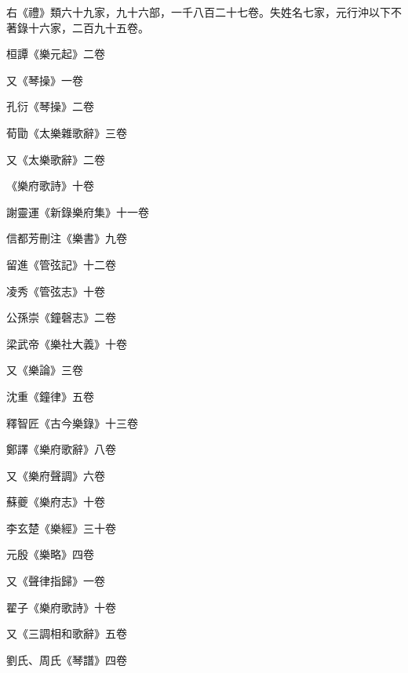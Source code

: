 \begin{pinyinscope}
 右《禮》類六十九家，九十六部，一千八百二十七卷。失姓名七家，元行沖以下不著錄十六家，二百九十五卷。



 桓譚《樂元起》二卷



 又《琴操》一卷



 孔衍《琴操》二卷



 荀勖《太樂雜歌辭》三卷



 又《太樂歌辭》二卷



 《樂府歌詩》十卷



 謝靈運《新錄樂府集》十一卷



 信都芳刪注《樂書》九卷



 留進《管弦記》十二卷



 凌秀《管弦志》十卷



 公孫崇《鐘磬志》二卷



 梁武帝《樂社大義》十卷



 又《樂論》三卷



 沈重《鐘律》五卷



 釋智匠《古今樂錄》十三卷



 鄭譯《樂府歌辭》八卷



 又《樂府聲調》六卷



 蘇夔《樂府志》十卷



 李玄楚《樂經》三十卷



 元殷《樂略》四卷



 又《聲律指歸》一卷



 翟子《樂府歌詩》十卷



 又《三調相和歌辭》五卷



 劉氏、周氏《琴譜》四卷




\end{pinyinscope}
